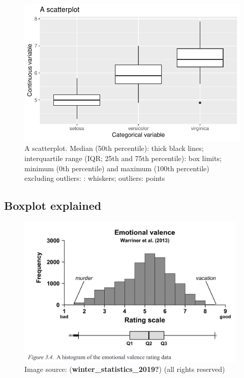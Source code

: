 \documentclass[
  letterpaper,
  DIV=11,
  numbers=noendperiod]{scrartcl}
\begin{document}
\begin{figure}[H]

{\centering \includegraphics{_data_viz_files/figure-pdf/unnamed-chunk-27-1.pdf}

}

\caption{A scatterplot. Median (50th percentile): thick black lines;
interquartile range (IQR; 25th and 75th percentile): box limits; minimum
(0th percentile) and maximum (100th percentile) excluding outliers: :
whiskers; outliers: points}

\end{figure}

\hypertarget{boxplot-explained}{%
\subsection{Boxplot explained}\label{boxplot-explained}}

\begin{figure}

{\centering \includegraphics[width=4.32in,height=\textheight]{_data_viz_files/figure-pdf/unnamed-chunk-29-1.png}

}

\caption{Image source: (\textbf{winter\_statistics\_2019?}) (all rights
reserved)}

\end{figure}
\end{document}
